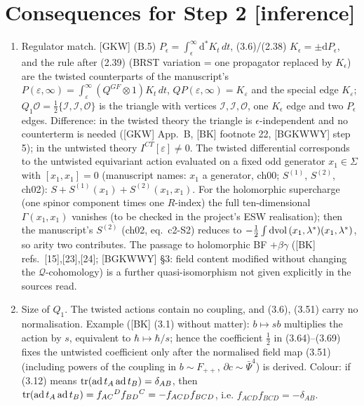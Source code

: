 \documentclass[10pt]{article}
\begin{document}
\section{Consequences for Step 2 \textbf{[inference]}}\label{sec:inf}
\begin{enumerate}
\item Regulator match. [GKW] (B.5) $P_\epsilon=\int_\epsilon^\infty\mathrm d^*K_t\,dt$, (3.6)/(2.38) $K_\epsilon=\pm\mathrm dP_\epsilon$, and the rule after (2.39) (BRST variation = one propagator replaced by $K_\epsilon$) are the twisted counterparts of the manuscript's $P(\varepsilon,\infty)=\int_\varepsilon^\infty(Q^{GF}\otimes1)K_t\,dt$, $QP(\varepsilon,\infty)=K_\varepsilon$ and the special edge $K_\varepsilon$; $Q_1\mathcal O=\frac12\{\mathcal I,\mathcal I,\mathcal O\}$ is the triangle with vertices $\mathcal I,\mathcal I,\mathcal O$, one $K_\epsilon$ edge and two $P_\epsilon$ edges. Difference: in the twisted theory the triangle is $\epsilon$-independent and no counterterm is needed ([GKW] App.~B, [BK] footnote 22, [BGKWWY] step 5); in the untwisted theory $I^{CT}[\varepsilon]\neq0$. The twisted differential corresponds to the untwisted equivariant action evaluated on a fixed odd generator $x_1\in\Sigma$ with $[x_1,x_1]=0$ (manuscript names: $x_1$ a generator, ch00; $S^{(1)}$, $S^{(2)}$, ch02): $S+S^{(1)}(x_1)+S^{(2)}(x_1,x_1)$. For the holomorphic supercharge (one spinor component times one $R$-index) the full ten-dimensional $\Gamma(x_1,x_1)$ vanishes (to be checked in the project's ESW realisation); then the manuscript's $S^{(2)}$ (ch02, eq.~c2-S2) reduces to $-\frac12\int{\rm dvol}\,(x_1,\lambda^*)(x_1,\lambda^*)$, so arity two contributes. The passage to holomorphic BF $+\beta\gamma$ ([BK] refs.~[15],[23],[24]; [BGKWWY] \S3: field content modified without changing the $\mathcal Q$-cohomology) is a further quasi-isomorphism not given explicitly in the sources read.
\item Size of $Q_1$. The twisted actions contain no coupling, and (3.6), (3.51) carry no normalisation. Example ([BK] (3.1) without matter): $b\mapsto sb$ multiplies the action by $s$, equivalent to $\hbar\mapsto\hbar/s$; hence the coefficient $\tfrac12$ in (3.64)--(3.69) fixes the untwisted coefficient only after the normalised field map (3.51) (including powers of the coupling in $b\sim F_{++}$, $\partial c\sim\bar\Psi^4$) is derived. Colour: if (3.12) means ${\rm tr}(\mathrm{ad}\,t_A\,\mathrm{ad}\,t_B)=\delta_{AB}$, then ${\rm tr}(\mathrm{ad}\,t_A\,\mathrm{ad}\,t_B)=f_{AC}{}^Df_{BD}{}^C=-f_{ACD}f_{BCD}$, i.e. $f_{ACD}f_{BCD}=-\delta_{AB}$.

\end{enumerate}
\end{document}

